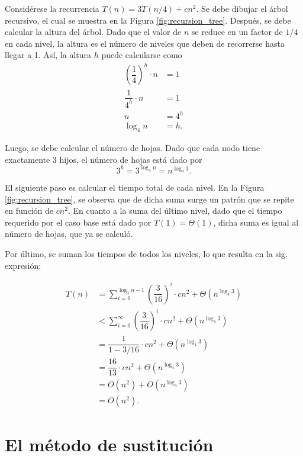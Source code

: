 \newpage

\begin{expl}
  Considérese la recurrencia \(T(n)=3T(n/4)+cn^2\). 
  Se debe dibujar el árbol recursivo, el cual se muestra en la Figura \ref{fig:recursion_tree}.
  Después, se debe calcular la altura del árbol. 
  Dado que el valor de \(n\) se reduce en un factor de \(1/4\) en cada nivel, la altura es el número de niveles que deben de recorrerse hasta llegar a 1. Así, la altura \(h\) puede calcularse como
  \[
    \begin{aligned}
      \left(\dfrac{1}{4}\right)^h\cdot n &= 1 \\
      \dfrac{1}{4^h}\cdot n &= 1 \\
      n &= 4^h \\
      \log_4{n} &= h.
    \end{aligned}
  \]
  
  Luego, se debe calcular el número de hojas.
  Dado que cada nodo tiene exactamente 3 hijos, el número de hojas está dado por
  \[
    3^h = 3^{\log_4{n}} = n^{\log_4{3}}.
  \]
  
  El siguiente paso es calcular el tiempo total de cada nivel.
  En la Figura \ref{fig:recursion_tree}, se observa que de dicha suma surge un patrón que se repite en función de \(cn^2\).
  En cuanto a la suma del último nivel, dado que el tiempo requerido por el caso base está dado por \(T(1)=\Theta(1)\), dicha suma es igual al número de hojas, que ya se calculó.
  
  Por último, se suman los tiempos de todos los niveles, lo que resulta en la sig. expresión:
  
  \begin{align*}
    T(n)&=\sum_{i=0}^{\log_{4}n-1}\left(\dfrac{3}{16}\right)^{i}\cdot cn^{2}+\Theta(n^{\log_{4}3}) \\
    &<\sum_{i=0}^{\infty}\left(\dfrac{3}{16}\right)^{i}\cdot cn^{2}+\Theta(n^{\log_{4}3}) \\
    &=\dfrac{1}{1-3/16}\cdot cn^{2}+\Theta(n^{\log_{4}3}) \\
    &=\dfrac{16}{13}\cdot cn^{2}+\Theta(n^{\log_{4}3}) \\
    &=O(n^{2})+O(n^{\log_{4}3}) \\
    &=O(n^{2}).
  \end{align*}
	\exend
\end{expl}
\newpage



\section{El método de sustitución}

